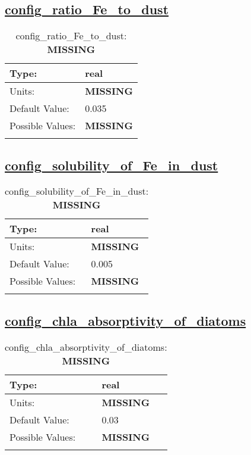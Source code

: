 \subsection[config\_ratio\_Fe\_to\_dust]{\hyperref[sec:nm_tab_biogeochemistry]{config\_ratio\_Fe\_to\_dust}}
\label{subsec:nm_sec_config_ratio_Fe_to_dust}
\begin{center}
\begin{longtable}{| p{2.0in} || p{4.0in} |}
    \hline
    Type: & real \\
    \hline
    Units: & {\bf \color{red} MISSING} \\
    \hline
    Default Value: & 0.035 \\
    \hline
    Possible Values: & {\bf \color{red} MISSING} \\
    \hline
    \caption{config\_ratio\_Fe\_to\_dust: {\bf \color{red} MISSING}}
\end{longtable}
\end{center}
\subsection[config\_solubility\_of\_Fe\_in\_dust]{\hyperref[sec:nm_tab_biogeochemistry]{config\_solubility\_of\_Fe\_in\_dust}}
\label{subsec:nm_sec_config_solubility_of_Fe_in_dust}
\begin{center}
\begin{longtable}{| p{2.0in} || p{4.0in} |}
    \hline
    Type: & real \\
    \hline
    Units: & {\bf \color{red} MISSING} \\
    \hline
    Default Value: & 0.005 \\
    \hline
    Possible Values: & {\bf \color{red} MISSING} \\
    \hline
    \caption{config\_solubility\_of\_Fe\_in\_dust: {\bf \color{red} MISSING}}
\end{longtable}
\end{center}
\subsection[config\_chla\_absorptivity\_of\_diatoms]{\hyperref[sec:nm_tab_biogeochemistry]{config\_chla\_absorptivity\_of\_diatoms}}
\label{subsec:nm_sec_config_chla_absorptivity_of_diatoms}
\begin{center}
\begin{longtable}{| p{2.0in} || p{4.0in} |}
    \hline
    Type: & real \\
    \hline
    Units: & {\bf \color{red} MISSING} \\
    \hline
    Default Value: & 0.03 \\
    \hline
    Possible Values: & {\bf \color{red} MISSING} \\
    \hline
    \caption{config\_chla\_absorptivity\_of\_diatoms: {\bf \color{red} MISSING}}
\end{longtable}
\end{center}
